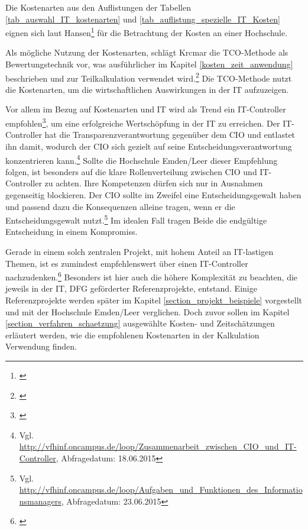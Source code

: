 Die Kostenarten aus den Auflistungen der Tabellen \ref{tab_auswahl_IT_kostenarten} und \ref{tab_auflistung_spezielle_IT_Kosten} eignen sich laut Hansen\footnote{\autocite[493-498]{hansen_business_2009}} für die Betrachtung der Kosten an einer Hochschule.

Als mögliche Nutzung der Kostenarten, schlägt Krcmar die TCO-Methode als Bewertungstechnik vor, was ausführlicher im Kapitel \ref{kosten_zeit_anwendung} beschrieben und zur Teilkalkulation verwendet wird.\footnote{\autocite[144]{krcmar_einfuhrung_2015}} Die TCO-Methode nutzt die Kostenarten, um die wirtschaftlichen Auswirkungen in der IT aufzuzeigen.

\clearpage

Vor allem im Bezug auf Kostenarten und IT wird als Trend ein IT-Controller empfohlen\footnote{\autocite[49]{gadatsch_masterkurs_2014}}, um eine erfolgreiche Wertschöpfung in der IT zu erreichen. Der IT-Controller hat die Transparenzverantwortung gegenüber dem CIO und entlastet ihn damit, wodurch der CIO sich gezielt auf seine Entscheidungsverantwortung konzentrieren kann.\footnote{Vgl. \url{http://vfhinf.oncampus.de/loop/Zusammenarbeit_zwischen_CIO_und_IT-Controller}, Abfragedatum: 18.06.2015} Sollte die Hochschule Emden/Leer dieser Empfehlung folgen, ist besonders auf die klare Rollenverteilung zwischen CIO und IT-Controller zu achten. Ihre Kompetenzen dürfen sich nur in Ausnahmen gegenseitig blockieren. Der CIO sollte im Zweifel eine Entscheidungsgewalt haben und passend dazu die Konsequenzen alleine tragen, wenn er die Entscheidungsgewalt nutzt.\footnote{Vgl. \url{http://vfhinf.oncampus.de/loop/Aufgaben_und_Funktionen_des_Informationsmanagers}, Abfragedatum: 23.06.2015} Im idealen Fall tragen Beide die endgültige Entscheidung in einem Kompromiss.

Gerade in einem solch zentralen Projekt, mit hohem Anteil an IT-lastigen Themen, ist es zumindest empfehlenswert über einen IT-Controller nachzudenken.\footnote{\autocite[11-15]{stratmann_it_2013}} Besonders ist hier auch die höhere Komplexität zu beachten, die jeweils in der IT, DFG geförderter Referenzprojekte, entstand. Einige Referenzprojekte werden später im Kapitel \ref{section_projekt_beispiele} vorgestellt und mit der Hochschule Emden/Leer verglichen. Doch zuvor sollen im Kapitel \ref{section_verfahren_schaetzung} ausgewählte Kosten- und Zeitschätzungen erläutert werden, wie die empfohlenen Kostenarten in der Kalkulation Verwendung finden.

